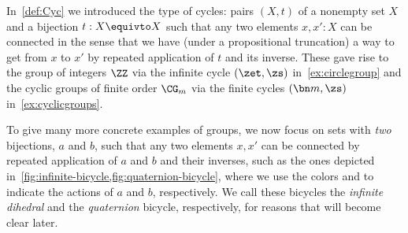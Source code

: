 In~\cref{def:Cyc} we introduced the type of cycles:
pairs $(X,t)$ of a nonempty set $X$
and a bijection $t : X \equivto X$
such that any two elements $x,x':X$ can be connected
in the sense that we have (under a propositional truncation)
a way to get from $x$ to $x'$ by repeated application of $t$ and its inverse.
These gave rise to the group of integers $\ZZ$
via the infinite cycle $(\zet,\zs)$
in~\cref{ex:circlegroup}
and the cyclic groups of finite order $\CG_m$
via the finite cycles $(\bn m,\zs)$
in~\cref{ex:cyclicgroups}.

\begin{marginfigure}
  \begin{center}
  \end{center}
  \caption{The infinite dihedral bicycle.}
  \label{fig:infinite-bicycle}
\end{marginfigure}
\begin{marginfigure}
  \begin{center}
    \footnotesize
  \end{center}
  \caption{The quaternion bicycle.}
  \label{fig:quaternion-bicycle}
\end{marginfigure}
To give many more concrete examples of groups,
we now focus on sets with \emph{two} bijections,
$a$ and $b$, such that any two elements $x,x'$
can be connected by repeated application
of $a$ and $b$ and their inverses,
such as the ones depicted
in~\cref{fig:infinite-bicycle,fig:quaternion-bicycle},
where we use the colors \casredname
and \casbluename to indicate the actions
of $a$ and $b$, respectively.
We call these bicycles the \emph{infinite dihedral}
and the \emph{quaternion} bicycle, respectively,
for reasons that will become clear later.

